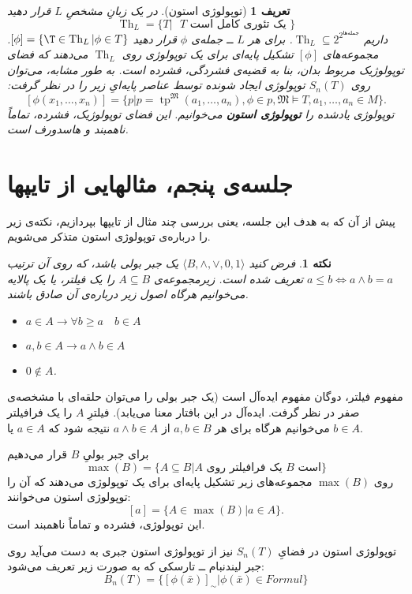 \documentclass[12pt,a4paper]{report}
\theoremstyle{colorhead}
\newtheorem{defn}[thm]{تعریف}
\newtheorem{nokte}[thm]{نکته}
\DeclareMathOperator{\Th}{Th}
\DeclareMathOperator{\tp}{tp}
\begin{document}
\begin{defn}[توپولوژی استون]
در یک زبانِ مشخصِ
$L$
قرار دهید
\[
\Th_L=\{T|\text{ $T$ یک تئوری کامل است }\}
\]
داریم
$\Th_L\subseteq 2^{2^{\text{جمله‌ها}}}$.
برای هر 
$L$
ــ
جمله‌ی
$\phi$
قرار دهید
$[\phi]=\{\T\in \Th_L|\phi\in T\}$.
مجموعه‌های
$[\phi]$
تشکیل پایه‌ای برای یک توپولوژی روی
$\Th_L$
می‌دهند که فضای توپولوژیک مربوط بدان، بنا به قضیه‌ی فشردگی، فشرده است. به طور مشابه، می‌توان روی
 $S_n(T)$
 توپولوژی ایجاد شونده توسط عناصر پایه‌ایِ زیر را در نظر گرفت:
\[ 
 [\phi(x_1,\ldots,x_n)]=\{p|
p=\tp^\mathfrak{M}(a_1,\ldots,a_n),
 \phi\in 
p,\mathfrak{M}\models T,a_1,\ldots,a_n\in M\}.
\]
توپولوژی یادشده را \textbf{توپولوژی استون} می‌خوانیم. این فضای توپولوژیک، فشرده، تماماً ناهمبند و هاسدورف است.
\end{defn}
\pagebreak
\section{جلسه‌ی پنجم، مثالهایی از تایپها}
پیش از آن که به هدف این جلسه، یعنی 
بررسی چند مثال از تایپها بپردازیم، نکته‌ی زیر را درباره‌ی توپولوژی استون متذکر می‌شویم.
\begin{nokte}
فرض کنید
$\langle B,\wedge,\vee, 0,1\rangle$
یک جبر بولی باشد، که روی آن ترتیب 
$a\leq b\Leftrightarrow a\wedge b=a$
تعریف شده است. زیرمجموعه‌ی
$A\subseteq B$
را یک فیلتر، یا یک پالایه می‌خوانیم هرگاه
اصول زیر درباره‌ی آن صادق باشند.
\begin{itemize}
\item 
$a\in A\to \forall b\geq a \quad b\in A$
\item $a,b\in A\to a\wedge b\in A$
\item $0\not\in A$.
\end{itemize}
\end{nokte}
مفهوم
فیلتر،‌ دوگان مفهوم ایده‌آل است (یک جبر بولی را می‌توان حلقه‌ای با مشخصه‌ی صفر در نظر گرفت. ایده‌آل در این بافتار معنا می‌یابد). فیلترِ
$A$
را یک فرافیلتر می‌خوانیم هرگاه برای هر
$a,b\in B$
از
$a\wedge b\in A$
نتیجه شود که
$a\in A$
یا
$b\in A$.
\par 
برای جبر بولیِ
$B$
قرار می‌دهیم
\[
\max({B})=\{A\subseteq B| \text{$A$ یک فرافیلتر روی $B$ است}\}
\]
روی
$\max({B})$
مجموعه‌های زیر تشکیل پایه‌ای برای یک توپولوژی می‌دهند که آن را توپولوژی استون می‌خوانند:
\[
[a]=\{A\in \max(B)|a\in A\}.
\]
این توپولوژی، فشرده و تماماً ناهمبند است. 
\par 
توپولوژی استون در فضایِ
$S_n(T)$
نیز از توپولوژی استون جبری به دست می‌آید  روی جبر
لیندنبام ــ تارسکی  که به صورت زیر تعریف می‌شود:
\[
B_n(T)=\{[\phi(\bar{x})]_\sim| \phi(\bar{x})\in Formul\}
\]
\end{document}
